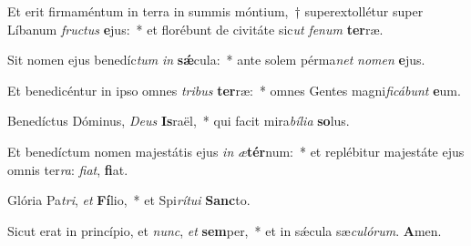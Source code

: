 \item Et erit firmaméntum in terra in summis móntium,~† superextollétur super Líbanum \textit{fruc}\textit{tus} \textbf{e}jus:~* et florébunt de civitáte sic\textit{ut} \textit{fe}\textit{num} \textbf{ter}ræ.
\item Sit nomen ejus benedíc\textit{tum} \textit{in} \textbf{sǽ}cula:~* ante solem pérma\textit{net} \textit{no}\textit{men} \textbf{e}jus.
\item Et benedicéntur in ipso omnes \textit{tri}\textit{bus} \textbf{ter}ræ:~* omnes Gentes magni\textit{fi}\textit{cá}\textit{bunt} \textbf{e}um.
\item Benedíctus Dóminus, \textit{De}\textit{us} \textbf{Is}raël,~* qui facit mira\textit{bí}\textit{li}\textit{a} \textbf{so}lus.
\item Et benedíctum nomen majestátis ejus \textit{in} \textit{æ}\textbf{tér}num:~* et replébitur majestáte ejus omnis ter\textit{ra}: \textit{fi}\textit{at}, \textbf{fi}at.
\item Glória Pa\textit{tri}, \textit{et} \textbf{Fí}lio,~* et Spi\textit{rí}\textit{tu}\textit{i} \textbf{Sanc}to.
\item Sicut erat in princípio, et \textit{nunc}, \textit{et} \textbf{sem}per,~* et in sǽcula sæ\textit{cu}\textit{ló}\textit{rum}. \textbf{A}men.
